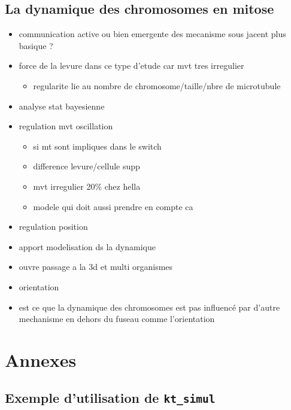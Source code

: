 \documentclass[12pt,a4paper,twoside,openright]{book}
\providecommand{\tightlist}{%
  \setlength{\itemsep}{0pt}\setlength{\parskip}{0pt}}
\begin{document}
\section{La dynamique des chromosomes en
mitose}\label{la-dynamique-des-chromosomes-en-mitose}

\begin{itemize}
\item
  communication active ou bien emergente des mecanisme sous jacent plus
  basique ?
\item
  force de la levure dans ce type d'etude car mvt tres irregulier

  \begin{itemize}
  \tightlist
  \item
    regularite lie au nombre de chromosome/taille/nbre de microtubule
  \end{itemize}
\item
  analyse stat bayesienne
\item
  regulation mvt oscillation

  \begin{itemize}
  \tightlist
  \item
    si mt sont impliques dans le switch
  \item
    difference levure/cellule supp
  \item
    mvt irregulier 20\% chez hella
  \item
    modele qui doit aussi prendre en compte ca
  \end{itemize}
\item
  regulation position
\item
  apport modelisation ds la dynamique
\item
  ouvre passage a la 3d et multi organismes
\item
  orientation
\item
  est ce que la dynamique des chromosomes est pas influencé par d'autre
  mechanisme en dehors du fuseau comme l'orientation
\end{itemize}

\appendix

\chapter{Annexes}\label{annexes}

\section{\texorpdfstring{Exemple d'utilisation de
\texttt{kt\_simul}}{Exemple d'utilisation de kt\_simul}}\label{exemple-dutilisation-de-ktux5fsimul}
\end{document}
